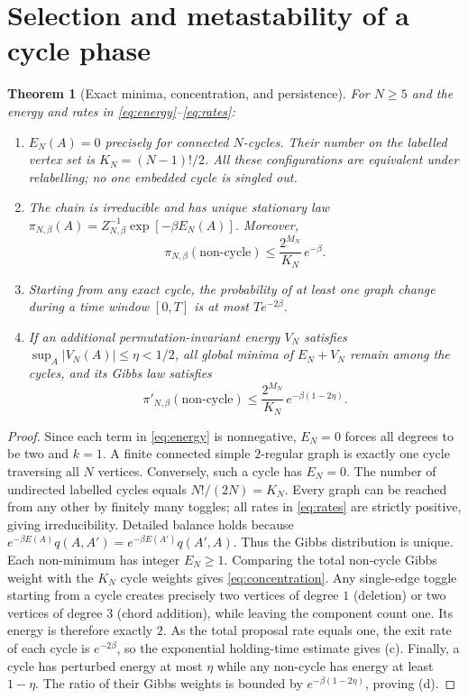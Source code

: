 \documentclass[11pt,a4paper]{article}
\numberwithin{equation}{section}
\newtheorem{theorem}{Theorem}[section]
\newcommand{\1}{\mathbf{1}}
\begin{document}
\section{Selection and metastability of a cycle phase}
\begin{theorem}[Exact minima, concentration, and persistence]\label{thm:cycle}
For $N\geq5$ and the energy and rates in \eqref{eq:energy}--\eqref{eq:rates}:
\begin{enumerate}
\item[(a)] $E_N(A)=0$ precisely for connected $N$-cycles. Their number on the labelled vertex set is $K_N=(N-1)!/2$. All these configurations are equivalent under relabelling; no one embedded cycle is singled out.
\item[(b)] The chain is irreducible and has unique stationary law $\pi_{N,\beta}(A)=Z_{N,\beta}^{-1}\exp[-\beta E_N(A)]$. Moreover,
\begin{equation}\label{eq:concentration}
 \pi_{N,\beta}(\text{non-cycle})\leq\frac{2^{M_N}}{K_N}\,e^{-\beta}.
\end{equation}
\item[(c)] Starting from any exact cycle, the probability of at least one graph change during a time window $[0,T]$ is at most $Te^{-2\beta}$.
\item[(d)] If an additional permutation-invariant energy $V_N$ satisfies $\sup_A|V_N(A)|\leq\eta<1/2$, all global minima of $E_N+V_N$ remain among the cycles, and its Gibbs law satisfies
\begin{equation}\label{eq:robust}
 \pi'_{N,\beta}(\text{non-cycle})\leq\frac{2^{M_N}}{K_N}\,e^{-\beta(1-2\eta)}.
\end{equation}
\end{enumerate}
\end{theorem}
\begin{proof}
Since each term in \eqref{eq:energy} is nonnegative, $E_N=0$ forces all degrees to be two and $k=1$. A finite connected simple $2$-regular graph is exactly one cycle traversing all $N$ vertices. Conversely, such a cycle has $E_N=0$. The number of undirected labelled cycles equals $N!/(2N)=K_N$. Every graph can be reached from any other by finitely many toggles; all rates in \eqref{eq:rates} are strictly positive, giving irreducibility. Detailed balance holds because
$e^{-\beta E(A)}q(A,A')=e^{-\beta E(A')}q(A',A)$.
Thus the Gibbs distribution is unique. Each non-minimum has integer $E_N\geq1$. Comparing the total non-cycle Gibbs weight with the $K_N$ cycle weights gives \eqref{eq:concentration}. Any single-edge toggle starting from a cycle creates precisely two vertices of degree $1$ (deletion) or two vertices of degree $3$ (chord addition), while leaving the component count one. Its energy is therefore exactly $2$. As the total proposal rate equals one, the exit rate of each cycle is $e^{-2\beta}$, so the exponential holding-time estimate gives (c). Finally, a cycle has perturbed energy at most $\eta$ while any non-cycle has energy at least $1-\eta$. The ratio of their Gibbs weights is bounded by $e^{-\beta(1-2\eta)}$, proving (d).
\end{proof}
\end{document}
